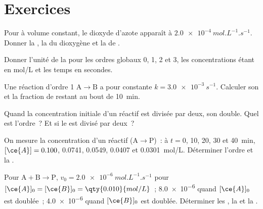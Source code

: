\section{Exercices}

\begin{exercise}[$\star$]\label{exo:b1:rate-laws:1}
Pour  à volume constant, le dioxyde d'azote
apparaît à $\qty{2.0e-4}{mol.L^{-1}.s^{-1}}$. Donner la , la  du dioxygène et la  de .
\end{exercise}

\begin{exercise}[$\star$]\label{exo:b1:rate-laws:2}
Donner l'unité de la  pour les ordres globaux 0, 1, 2
et 3, les concentrations étant en \unit{mol/L} et les temps en secondes.
\end{exercise}

\begin{exercise}[$\star$]\label{exo:b1:rate-laws:3}
Une réaction d'ordre 1 $\mathrm{A} \longrightarrow \mathrm{B}$ a pour
constante $k = \qty{3.0e-3}{s^{-1}}$. Calculer son  et la fraction de  restant au bout de \qty{10}{min}.
\end{exercise}

\begin{exercise}[$\star$]\label{exo:b1:rate-laws:4}
Quand la concentration initiale d'un réactif est divisée par deux, son
 double. Quel est l'ordre~? Et si le  est divisé par deux~?
\end{exercise}

\begin{exercise}[$\star\star$]\label{exo:b1:rate-laws:5}
On mesure la concentration d'un réactif 
($\mathrm{A} \longrightarrow \mathrm{P}$)~: à $t
= 0$, 10, 20, 30 et \qty{40}{min}, $[\ce{A}] = 0.100$, 0.0741, 0.0549,
0.0407 et \qty{0.0301}{mol/L}. Déterminer l'ordre et la .
\end{exercise}

\begin{exercise}[$\star\star$]\label{exo:b1:rate-laws:6}
Pour $\mathrm{A} + \mathrm{B} \longrightarrow \mathrm{P}$, $v_0 = \qty{2.0e-6}{mol.L^{-1}.s^{-1}}$ pour $[\ce{A}]_0
= [\ce{B}]_0 = \qty{0.010}{mol/L}$~; \qty{8.0e-6}{} quand $[\ce{A}]_0$
est doublée~; \qty{4.0e-6}{} quand $[\ce{B}]_0$ est doublée. Déterminer
les , la  et la .
\end{exercise}

